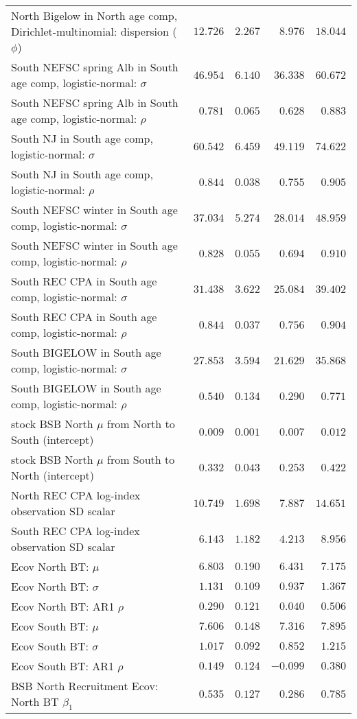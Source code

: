 \documentclass[
]{article}
\begin{document}
\begin{landscape}
\begin{longtable}[t]{lrrrr}
North Bigelow in North age comp, Dirichlet-multinomial: dispersion ($\phi$) & $12.726$ & $2.267$ & $8.976$ & $18.044$\\
South NEFSC spring Alb in South age comp, logistic-normal: $\sigma$ & $46.954$ & $6.140$ & $36.338$ & $60.672$\\
South NEFSC spring Alb in South age comp, logistic-normal: $\rho$ & $0.781$ & $0.065$ & $0.628$ & $0.883$\\
\addlinespace
South NJ in South age comp, logistic-normal: $\sigma$ & $60.542$ & $6.459$ & $49.119$ & $74.622$\\
South NJ in South age comp, logistic-normal: $\rho$ & $0.844$ & $0.038$ & $0.755$ & $0.905$\\
South NEFSC winter in South age comp, logistic-normal: $\sigma$ & $37.034$ & $5.274$ & $28.014$ & $48.959$\\
South NEFSC winter in South age comp, logistic-normal: $\rho$ & $0.828$ & $0.055$ & $0.694$ & $0.910$\\
South REC CPA in South age comp, logistic-normal: $\sigma$ & $31.438$ & $3.622$ & $25.084$ & $39.402$\\
\addlinespace
South REC CPA in South age comp, logistic-normal: $\rho$ & $0.844$ & $0.037$ & $0.756$ & $0.904$\\
South BIGELOW in South age comp, logistic-normal: $\sigma$ & $27.853$ & $3.594$ & $21.629$ & $35.868$\\
South BIGELOW in South age comp, logistic-normal: $\rho$ & $0.540$ & $0.134$ & $0.290$ & $0.771$\\
stock BSB North $\mu$ from North to South (intercept) & $0.009$ & $0.001$ & $0.007$ & $0.012$\\
stock BSB North $\mu$ from South to North (intercept) & $0.332$ & $0.043$ & $0.253$ & $0.422$\\
\addlinespace
North REC CPA log-index observation SD scalar & $10.749$ & $1.698$ & $7.887$ & $14.651$\\
South REC CPA log-index observation SD scalar & $6.143$ & $1.182$ & $4.213$ & $8.956$\\
Ecov North BT: $\mu$ & $6.803$ & $0.190$ & $6.431$ & $7.175$\\
Ecov North BT: $\sigma$ & $1.131$ & $0.109$ & $0.937$ & $1.367$\\
Ecov North BT: AR1 $\rho$ & $0.290$ & $0.121$ & $0.040$ & $0.506$\\
\addlinespace
Ecov South BT: $\mu$ & $7.606$ & $0.148$ & $7.316$ & $7.895$\\
Ecov South BT: $\sigma$ & $1.017$ & $0.092$ & $0.852$ & $1.215$\\
Ecov South BT: AR1 $\rho$ & $0.149$ & $0.124$ & $-0.099$ & $0.380$\\
BSB North Recruitment Ecov: North BT $\beta_1$ & $0.535$ & $0.127$ & $0.286$ & $0.785$\\*
\end{longtable}
\end{landscape}
\end{document}
